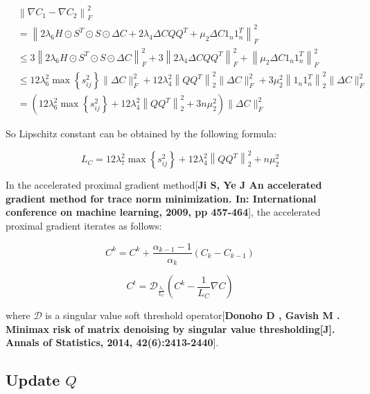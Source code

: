 \documentclass[final,3p,times]{elsarticle}
\begin{document}
\begin{equation}
	\begin{aligned}
		&\left\|\nabla C_{1}-\nabla C_{2}\right\|_{F}^{2} \\ 
		&=\left\|2 \lambda_{6} H \odot S^{T} \odot S \odot \Delta C+2 \lambda_{4} \Delta C Q Q^{T}+\mu_{2} \Delta C 1_n 1_{n}^{T}\right\|_{F}^{2} \\
		&\leq 3\left\|2 \lambda_{6} H \odot S^{T} \odot S \odot \Delta C\right\|_{F}^{2}+3\left\|2 \lambda_{4} \Delta C QQ^{T}\right\|_{F}^{2}+\left\|\mu_{2} \Delta C 1_{n} 1_{n}^{T}\right\|_{F}^{2} \\
		&\leq 12 \lambda_{6}^{2} \max \left\{s^{2}_{i j}\right\}\|\Delta C\|_{F}^{2}+12 \lambda_{4}^{2}\left\|QQ^{T}\right\|_{2}^{2}\|\Delta C\|_{F}^{2}+3\mu_{2}^{2}\left\|1_{n} 1_{n}^{T}\right\|_{2}^{2}\|\Delta C\|_{F}^{2} \\
		&=\left(12 \lambda_{6}^{2} \max \left\{s^{2}_{i j}\right\}+12 \lambda_{4}^{2}\left\| QQ^{T}\right\|_{2}^{2}+3n \mu_{2}^{2}\right)\|\Delta C\|_{F}^{2}
	\end{aligned}
	\end{equation}

So Lipschitz constant can be obtained by the following formula:

\begin{equation}
	L_{C}=12 \lambda_{7}^{2} \max \left\{s^{2}_{i j}\right\}+12 \lambda_{4}^{2}\left\| QQ^{T}\right\|_{2}^{2}+n \mu_{2}^{2}
\end{equation}


In the accelerated proximal gradient method[\textbf{Ji S, Ye J  An accelerated gradient method for trace norm minimization. In: International conference on machine learning, 2009, pp 457-464}], the accelerated proximal gradient iterates as follows:


\begin{equation}
	C^{k}=C^{k}+\frac{\alpha_{k-1}-1}{\alpha_{k}}\left(C_{k}-C_{k-1}\right)
\end{equation}

\begin{equation}
	C^{t}=\mathcal{D}_\frac{\lambda_{5}}{L_C}(C^{k}-\frac{1}{L_C} \nabla C)
\end{equation}

\noindent where $\mathcal{D}$ is a singular value soft threshold operator[\textbf{Donoho D , Gavish M . Minimax risk of matrix denoising by singular value thresholding[J]. Annals of Statistics, 2014, 42(6):2413-2440}].

\subsection{Update $Q$}
\end{document}
